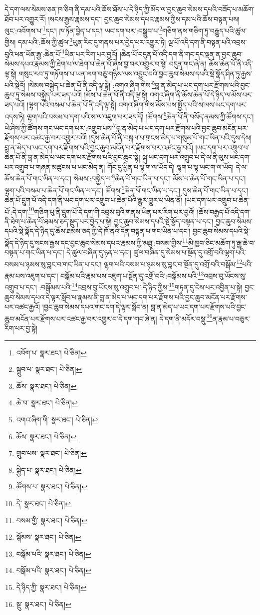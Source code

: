 དེ་དག་ལས་སེམས་ཅན་ཁ་ཅིག་ནི་དམ་པའི་ཆོས་ཐོས་པ་དེ་ཉིད་ཀྱི་མོད་ལ་བྱང་ཆུབ་སེམས་དཔའི་བཟོད་པ་མཆོག་ཐོབ་པར་འགྱུར་རོ། །སངས་རྒྱས་རྣམས་དང་། བྱང་ཆུབ་སེམས་དཔའ་རྣམས་ཀྱིས་དམ་པའི་ཆོས་བསྟན་པས། ལུང་:འབོགས་པ་\footnote{འབོག་པ་  སྣར་ཐང་།  པེ་ཅིན། }དང་། ཁ་ཏོན་བྱེད་པ་དང་། ཡང་དག་པར་:བསྒྲུབ་པ་\footnote{སྒྲུབ་པ་  སྣར་ཐང་།  པེ་ཅིན། }གཅིག་ནས་གཅིག་ཏུ་བརྒྱུད་པའི་ཚུལ་གྱིས། དམ་པའི་:ཆོས་ཀྱི་ཚུལ་\footnote{ཆོས་  སྣར་ཐང་།  པེ་ཅིན། }ཡུན་རིང་དུ་གནས་པར་བྱེད་པར་འགྱུར་ཏེ། ལྔ་པོ་འདི་དག་ནི་བསྟན་པའི་འབྲས་བུའི་ཕན་ཡོན་རྒྱ་:ཆེན་པོ་\footnote{ཆེ་བ་  སྣར་ཐང་།  པེ་ཅིན། }ཡིན་པར་རིག་པར་བྱའོ། །ཆེན་པོ་བདུན་པོ་འདི་དག་ནི་གང་དང་ལྡན་ན་བྱང་ཆུབ་སེམས་དཔའ་རྣམས་ཀྱི་ཐེག་པ་ལ་ཐེག་པ་ཆེན་པོ་ཞེས་བྱ་བར་འགྱུར་བ་སྟེ། བདུན་གང་ཞེ་ན། ཆོས་ཆེན་པོ་ནི་འདི་ལྟ་སྟེ། གསུང་རབ་ཏུ་གཏོགས་པ་ཡན་ལག་བཅུ་གཉིས་ལས་འབྱུང་བའི་བྱང་ཆུབ་སེམས་དཔའི་སྡེ་སྣོད་ཤིན་ཏུ་རྒྱས་པའི་སྡེའོ། །སེམས་བསྐྱེད་པ་ཆེན་པོ་ནི་འདི་ལྟ་སྟེ། :འགའ་ཞིག་གིས་\footnote{འགའ་ཞིག་གི་  སྣར་ཐང་།  པེ་ཅིན། }བླ་ན་མེད་པ་ཡང་དག་པར་རྫོགས་པའི་བྱང་ཆུབ་ཏུ་སེམས་བསྐྱེད་པར་ཟད་པའོ། །མོས་པ་ཆེན་པོ་ནི་འདི་ལྟ་སྟེ། འགའ་ཞིག་ནི་ཆོས་ཆེན་པོ་དེ་ཉིད་ལ་མོས་པར་ཟད་པའོ། །ལྷག་པའི་བསམ་པ་ཆེན་པོ་ནི་འདི་ལྟ་སྟེ། འགའ་ཞིག་གིས་མོས་པས་སྤྱོད་པའི་ས་ལས་ཡང་དག་པར་འདས་ཏེ། ལྷག་པའི་བསམ་པ་དག་པའི་ས་ལ་འཇུག་པར་ཟད་དོ། །ཚོགས་\footnote{ཆོས་  སྣར་ཐང་།  པེ་ཅིན། }ཆེན་པོ་ནི་བསོད་ནམས་ཀྱི་ཚོགས་དང་། ཡེ་ཤེས་ཀྱི་ཚོགས་གང་ཡང་དག་པར་:འགྲུབ་པས་\footnote{གྲུབ་པས་  སྣར་ཐང་།  པེ་ཅིན། }བླ་ན་མེད་པ་ཡང་དག་པར་རྫོགས་པའི་བྱང་ཆུབ་མངོན་པར་རྫོགས་པར་འཚང་རྒྱ་བར་འགྱུར་བའོ། །དུས་ཆེན་པོ་ནི་བསྐལ་པ་གྲངས་མེད་པ་གསུམ་པོ་གང་ཡིན་པའི་དུས་དེས། བླ་ན་མེད་པ་ཡང་དག་པར་རྫོགས་པའི་བྱང་ཆུབ་མངོན་པར་རྫོགས་པར་འཚང་རྒྱ་བའོ། །ཡང་དག་པར་འགྲུབ་པ་ཆེན་པོ་ནི་བླ་ན་མེད་པ་ཡང་དག་པར་རྫོགས་པའི་བྱང་ཆུབ་སྟེ། སྐུ་ཡང་དག་པར་འགྲུབ་པ་དེ་ལ་ནི་ལུས་ཡང་དག་པར་འགྲུབ་པ་གཞན་མཚུངས་པ་ཡང་མེད་ན། གོང་དུ་ཕྱིན་པ་ལྟ་ག་ལ་ཡོད་དེ། ལྷག་པ་ལྟ་ཡང་ག་ལ་ཡོད། དེ་ལ་ཆོས་ཆེན་པོ་གང་ཡིན་པ་དང་། སེམས་:བསྐྱེད་པ་\footnote{སྐྱེད་པ་  སྣར་ཐང་།  པེ་ཅིན། }ཆེན་པོ་གང་ཡིན་པ་དང་། མོས་པ་ཆེན་པོ་གང་ཡིན་པ་དང་། ལྷག་པའི་བསམ་པ་ཆེན་པོ་གང་ཡིན་པ་དང་། ཚོགས་\footnote{ཚོགས་པ་  སྣར་ཐང་།  པེ་ཅིན། }ཆེན་པོ་གང་ཡིན་པ་དང་། དུས་ཆེན་པོ་གང་ཡིན་པ་དང་། ཆེན་པོ་དྲུག་པོ་འདི་དག་ནི་ཡང་དག་པར་འགྲུབ་པ་ཆེན་པོའི་རྒྱུར་གྱུར་པ་ཡིན་ནོ། །ཡང་དག་པར་འགྲུབ་པ་ཆེན་པོ་:དེ་དག་\footnote{དེ་  སྣར་ཐང་།  པེ་ཅིན། }གཅིག་པུ་ནི་དྲུག་པོ་དེ་དག་གི་འབྲས་བུའི་གནས་ཡིན་པར་རིག་པར་བྱའོ། །ཆོས་བརྒྱད་པོ་འདི་དག་ནི་ཐེག་པ་ཆེན་པོ་ཐམས་ཅད་སྡུད་པར་བྱེད་པ་སྟེ། བྱང་ཆུབ་སེམས་དཔའི་སྡེ་སྣོད་བསྟན་པ་དང་། བྱང་ཆུབ་སེམས་དཔའི་སྡེ་སྣོད་དེ་ཉིད་དུ་ཆོས་ཐམས་ཅད་ཀྱི་དེ་ཁོ་ནའི་དོན་བསྟན་པ་གང་ཡིན་པ་དང་། བྱང་ཆུབ་སེམས་དཔའི་སྡེ་སྣོད་དེ་ཉིད་དུ་སངས་རྒྱས་དང་བྱང་ཆུབ་སེམས་དཔའ་རྣམས་ཀྱི་མཐུ་:བསམ་གྱིས་\footnote{བསམ་གྱི་  སྣར་ཐང་།  པེ་ཅིན། }མི་ཁྱབ་ཅིང་མཆོག་ཏུ་རྒྱ་ཆེ་བ་བསྟན་པ་གང་ཡིན་པ་དང་། དེ་ཚུལ་བཞིན་དུ་ཉན་པ་དང་། ཚུལ་བཞིན་དུ་སེམས་པ་སྔོན་དུ་འགྲོ་བའི་ལྷག་པའི་བསམ་པ་ཉམས་སུ་བླང་བ་གང་ཡིན་པ་དང་། ལྷག་པའི་བསམ་པ་ཉམས་སུ་བླང་བ་སྔོན་དུ་འགྲོ་བའི་བསྒོམ་\footnote{སྒོམས་  སྣར་ཐང་།  པེ་ཅིན། }པའི་རྣམ་པས་འཇུག་པ་དང་། བསྒོམ་པའི་རྣམ་པས་འཇུག་པ་སྔོན་དུ་འགྲོ་བའི་:བསྒོམས་པའི་\footnote{བསྒོམ་པའི་  སྣར་ཐང་།  པེ་ཅིན། }འབྲས་བུ་ཡོངས་སུ་འགྲུབ་པ་དང་། :བསྒོམས་པའི་\footnote{བསྒོམ་པའི་  སྣར་ཐང་།  པེ་ཅིན། }འབྲས་བུ་ཡོངས་སུ་འགྲུབ་པ་:དེ་ཉིད་ཀྱིས་\footnote{དེ་ཉིད་ཀྱི་  སྣར་ཐང་།  པེ་ཅིན། }གཏན་དུ་ངེས་པར་འབྱིན་པ་སྟེ། བྱང་ཆུབ་སེམས་དཔའ་དེ་ལྟར་སློབ་པ་རྣམས་ནི་བླ་ན་མེད་པ་ཡང་དག་པར་རྫོགས་པའི་བྱང་ཆུབ་མངོན་པར་རྫོགས་པར་འཚང་རྒྱའོ། །བྱང་ཆུབ་སེམས་དཔའ་གང་དག་དེ་ལྟར་སློབ་ན། བླ་ན་མེད་པ་ཡང་དག་པར་རྫོགས་པའི་བྱང་ཆུབ་མངོན་པར་རྫོགས་པར་འཚང་རྒྱ་བར་འགྱུར་བ་དེ་དག་གང་ཞེ་ན། དེ་དག་ནི་མདོར་བསྡུ་\footnote{སྡུ་  སྣར་ཐང་།  པེ་ཅིན། }ན་རྣམ་པ་བཅུར་རིག་པར་བྱ་སྟེ། 